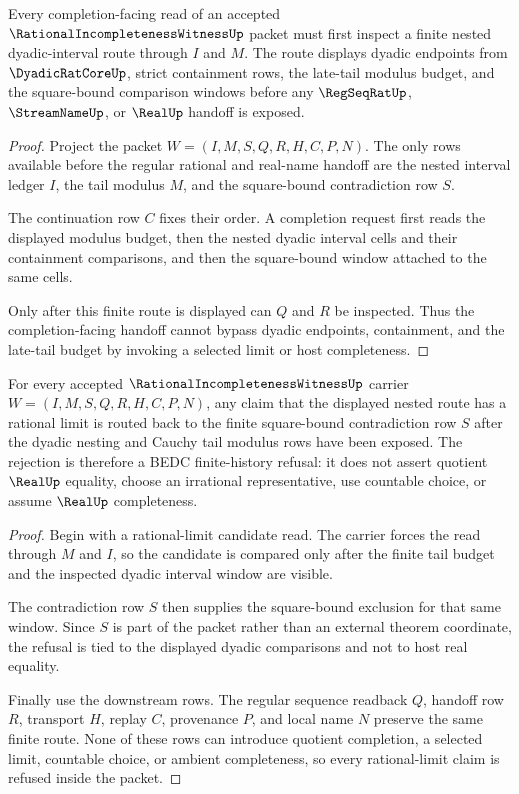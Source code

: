 \begin{theorem}
\label{thm:rational-incompleteness-witness-dyadic-nesting}
Every completion-facing read of an accepted $\RationalIncompletenessWitnessUp$ packet must first inspect a finite nested dyadic-interval route through $I$ and $M$. The route displays dyadic endpoints from $\DyadicRatCoreUp$, strict containment rows, the late-tail modulus budget, and the square-bound comparison windows before any $\RegSeqRatUp$, $\StreamNameUp$, or $\RealUp$ handoff is exposed.
\end{theorem}
\begin{proof}
Project the packet $W=(I,M,S,Q,R,H,C,P,N)$. The only rows available before the regular rational and real-name handoff are the nested interval ledger $I$, the tail modulus $M$, and the square-bound contradiction row $S$.

The continuation row $C$ fixes their order. A completion request first reads the displayed modulus budget, then the nested dyadic interval cells and their containment comparisons, and then the square-bound window attached to the same cells.

Only after this finite route is displayed can $Q$ and $R$ be inspected. Thus the completion-facing handoff cannot bypass dyadic endpoints, containment, and the late-tail budget by invoking a selected limit or host completeness.
\end{proof}

\begin{theorem}
\label{thm:rational-incompleteness-witness-no-rational-limit}
For every accepted $\RationalIncompletenessWitnessUp$ carrier $W=(I,M,S,Q,R,H,C,P,N)$, any claim that the displayed nested route has a rational limit is routed back to the finite square-bound contradiction row $S$ after the dyadic nesting and Cauchy tail modulus rows have been exposed. The rejection is therefore a BEDC finite-history refusal: it does not assert quotient $\RealUp$ equality, choose an irrational representative, use countable choice, or assume $\RealUp$ completeness.
\end{theorem}
\begin{proof}
Begin with a rational-limit candidate read. The carrier forces the read through $M$ and $I$, so the candidate is compared only after the finite tail budget and the inspected dyadic interval window are visible.

The contradiction row $S$ then supplies the square-bound exclusion for that same window. Since $S$ is part of the packet rather than an external theorem coordinate, the refusal is tied to the displayed dyadic comparisons and not to host real equality.

Finally use the downstream rows. The regular sequence readback $Q$, handoff row $R$, transport $H$, replay $C$, provenance $P$, and local name $N$ preserve the same finite route. None of these rows can introduce quotient completion, a selected limit, countable choice, or ambient completeness, so every rational-limit claim is refused inside the packet.
\end{proof}

